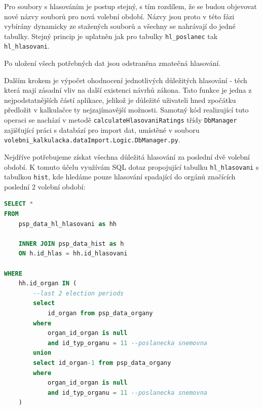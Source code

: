 \par Pro soubory s hlasováním je postup stejný, s tím rozdílem, že se budou objevovat nové názvy souborů pro nová volební období. Názvy jsou proto v této fázi vybírány dynamicky ze stažených souborů a všechny se nahrávají do jedné tabulky. Stejný princip je uplatněn jak pro tabulky \texttt{hl\_poslanec} tak \texttt{hl\_hlasovani}.\\

\par Po uložení všech potřebných dat jsou odstraněna zmatečná hlasování.\\ 

\par Dalším krokem je výpočet ohodnocení jednotlivých důležitých hlasování - těch která mají zásadní vliv na další existenci návrhů zákona. Tato funkce je jedna z nejpodstatnějších částí aplikace, jelikož je důležité uživateli hned zpočátku předložit v kalkulačce ty nejzajímavější možnosti. Samotný kód realizující tuto operaci se nachází v metodě \texttt{calculateHlasovaniRatings} třídy \texttt{DbManager} zajišťující práci s databází pro import dat, umístěné v souboru \texttt{volebni\_kalkulacka.dataImport.Logic.DbManager.py}. 
\par Nejdříve potřebujeme získat všechna důležitá hlasování za poslední dvě volební období. K tomuto účelu využívám SQL dotaz propojující tabulku \texttt{hl\_hlasovani} s tabulkou \texttt{hist}, kde hledáme pouze hlasování spadající do orgánů značících poslední 2 volební období:

\begin{lstlisting}[language=SQL, caption={SQL dotaz na všechna podstatná hlasování za poslední 2 volební období}, label=code:sql-dve-obdobi]
SELECT * 
FROM 
    psp_data_hl_hlasovani as hh

    INNER JOIN psp_data_hist as h
    ON h.id_hlas = hh.id_hlasovani

WHERE 
    hh.id_organ IN (
        --last 2 election periods
        select 
            id_organ from psp_data_organy 
        where 
            organ_id_organ is null
            and id_typ_organu = 11 --poslanecka snemovna
        union
        select id_organ-1 from psp_data_organy 
        where 
            organ_id_organ is null
            and id_typ_organu = 11 --poslanecka snemovna
    )
\end{lstlisting}

